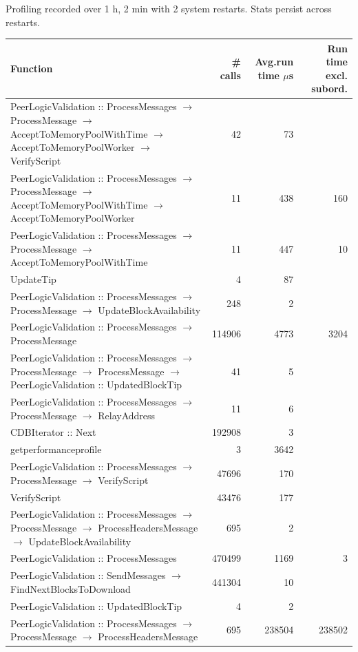 \documentclass{article}
\begin{document}
\begin{table}
	Profiling recorded over 1 h, 2 min with 2 system restarts. Stats persist across restarts.
	
	\begin{longtable}{P{8cm}|r|r|r}
		Function&\# calls& Avg.run time $\mu$s& Run time excl. subord. \\\hline
		PeerLogicValidation :: ProcessMessages $\to$ ProcessMessage $\to$ AcceptToMemoryPoolWithTime $\to$ AcceptToMemoryPoolWorker $\to$ VerifyScript& 42& 73&\\\hline
		PeerLogicValidation :: ProcessMessages $\to$ ProcessMessage $\to$ AcceptToMemoryPoolWithTime $\to$ AcceptToMemoryPoolWorker& 11& 438&160\\\hline
		PeerLogicValidation :: ProcessMessages $\to$ ProcessMessage $\to$ AcceptToMemoryPoolWithTime& 11& 447&10\\\hline
		UpdateTip& 4& 87&\\\hline
		PeerLogicValidation :: ProcessMessages $\to$ ProcessMessage $\to$ UpdateBlockAvailability& 248& 2&\\\hline
		PeerLogicValidation :: ProcessMessages $\to$ ProcessMessage& 114906& 4773&3204\\\hline
		PeerLogicValidation :: ProcessMessages $\to$ ProcessMessage $\to$ ProcessMessage $\to$ PeerLogicValidation :: UpdatedBlockTip& 41& 5&\\\hline
		PeerLogicValidation :: ProcessMessages $\to$ ProcessMessage $\to$ RelayAddress& 11& 6&\\\hline
		CDBIterator :: Next& 192908& 3&\\\hline
		getperformanceprofile& 3& 3642&\\\hline
		PeerLogicValidation :: ProcessMessages $\to$ ProcessMessage $\to$ VerifyScript& 47696& 170&\\\hline
		VerifyScript& 43476& 177&\\\hline
		PeerLogicValidation :: ProcessMessages $\to$ ProcessMessage $\to$ ProcessHeadersMessage $\to$ UpdateBlockAvailability& 695& 2&\\\hline
		PeerLogicValidation :: ProcessMessages& 470499& 1169&3\\\hline
		PeerLogicValidation :: SendMessages $\to$ FindNextBlocksToDownload& 441304& 10&\\\hline
		PeerLogicValidation :: UpdatedBlockTip& 4& 2&\\\hline
		PeerLogicValidation :: ProcessMessages $\to$ ProcessMessage $\to$ ProcessHeadersMessage& 695& 238504&238502\\\hline

\end{longtable}
\end{table}
\end{document}
